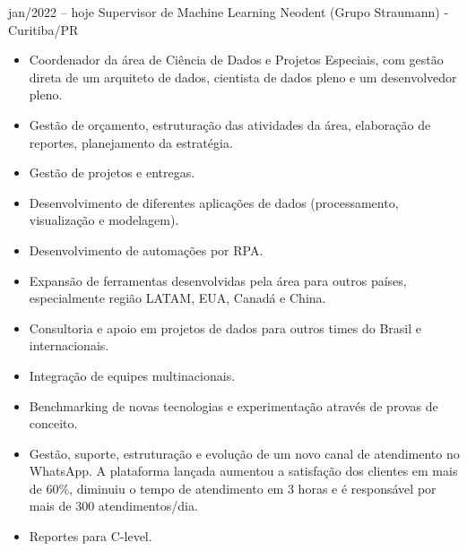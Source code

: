 \documentclass[9pt]{developercv} %
\begin{document}
	\begin{entrylist}
		\entry
		{jan/2022 -- hoje}
		{Supervisor de Machine Learning}
		{Neodent (Grupo Straumann) - Curitiba/PR}
		{\vspace{-10pt}
			\begin{itemize}[noitemsep,topsep=0pt,parsep=0pt,partopsep=0pt, leftmargin=-1pt]
				\item Coordenador da área de Ciência de Dados e Projetos Especiais, com gestão direta de um arquiteto de dados, cientista de dados pleno e um desenvolvedor pleno.
				\item Gestão de orçamento, estruturação das atividades da área, elaboração de reportes, planejamento da estratégia.
				\item Gestão de projetos e entregas.
				\item Desenvolvimento de diferentes aplicações de dados (processamento, visualização e modelagem).
				\item Desenvolvimento de automações por RPA.
				\item Expansão de ferramentas desenvolvidas pela área para outros países, especialmente região LATAM, EUA, Canadá e China.
				\item Consultoria e apoio em projetos de dados para outros times do Brasil e internacionais.
				\item Integração de equipes multinacionais.
				\item Benchmarking de novas tecnologias e experimentação através de provas de conceito.
				\item Gestão, suporte, estruturação e evolução de um novo canal de atendimento no WhatsApp.  A plataforma lançada aumentou a satisfação dos clientes em mais de 60\%, diminuiu o tempo de atendimento em 3 horas e é responsável por mais de 300 atendimentos/dia.
				\item Reportes para C-level.
				

\end{itemize}}
\end{entrylist}
\end{document}
